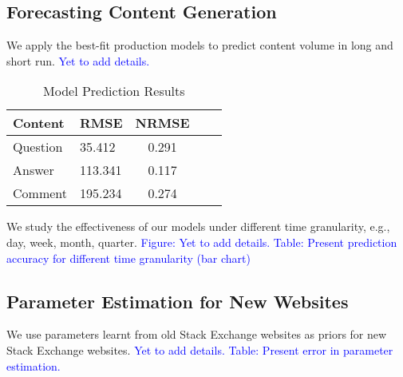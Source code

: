 \subsection{Forecasting Content Generation} 
We apply the best-fit production models to predict content volume in long and short run. \textcolor{blue}{Yet to add details.}

\begin{table}[ht]
	\vspace{-0.5\baselineskip}
	\caption{Model Prediction Results}
    \vspace{-\baselineskip}
	\label{tbl:model_prediction}
	\begin{center}
	\begin{tabular}{llccc}
    \toprule
    Content & RMSE & NRMSE\\
    \midrule
    Question & 35.412 & 0.291\\
    Answer & 113.341 & 0.117\\
    Comment & 195.234 & 0.274\\
    \bottomrule
	\end{tabular}
	\end{center}
    \vspace{-\baselineskip}
\end{table}

We study the effectiveness of our models under different time granularity, e.g., day, week, month, quarter. \textcolor{blue}{Figure: Yet to add details. Table: Present prediction accuracy for different time granularity (bar chart)}

\subsection{Parameter Estimation for New Websites} 
We use parameters learnt from old Stack Exchange websites as priors for new Stack Exchange websites. \textcolor{blue}{Yet to add details. Table: Present error in parameter estimation.}




